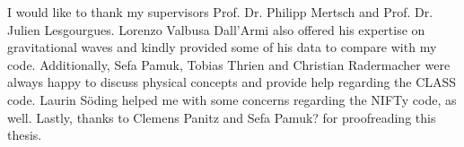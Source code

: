 I would like to thank my supervisors Prof. Dr. Philipp Mertsch and Prof. Dr. Julien Lesgourgues. Lorenzo Valbusa Dall'Armi also offered his expertise on gravitational waves and kindly provided some of his data to compare with my code. Additionally, Sefa Pamuk, Tobias Thrien and Christian Radermacher were always happy to discuss physical concepts and provide help regarding the CLASS code. Laurin Söding helped me with some concerns regarding the NIFTy code, as well. Lastly, thanks to Clemens Panitz and Sefa Pamuk? for proofreading this thesis.